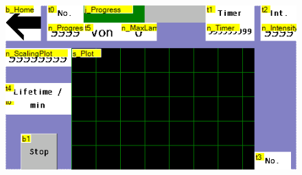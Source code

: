 	
	\begin{figure}[h]
		\centering
		\includegraphics[width=0.7\linewidth]{LamellaDevice_Hardware/MeasurementPage}
		\caption{}
		\label{fig:measurementpage}
	\end{figure}
	
	
	
	
%
%
%	
%	
%	
%	
